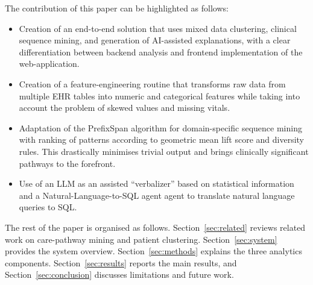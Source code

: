 The contribution of this paper can be highlighted as follows:

\begin{itemize}
  \item Creation of an end-to-end solution that uses mixed data clustering, clinical sequence mining, and generation of AI-assisted explanations, with a clear differentiation between backend analysis and frontend implementation of the web-application.
  \item Creation of a feature-engineering routine that transforms raw data from multiple EHR tables into numeric and categorical features while taking into account the problem of skewed values and missing vitals.
  \item Adaptation of the PrefixSpan algorithm for domain-specific sequence mining with ranking of patterns according to geometric mean lift score and diversity rules. This drastically minimises trivial output and brings clinically significant pathways to the forefront.
  \item Use of an LLM as an assisted ``verbalizer'' based on statistical information and a Natural-Language-to-SQL agent agent to translate natural language queries to SQL.
\end{itemize}

The rest of the paper is organised as follows. Section~\ref{sec:related} reviews related work on care-pathway mining and patient clustering. Section~\ref{sec:system} provides the system overview. Section~\ref{sec:methods} explains the three analytics components. Section~\ref{sec:results} reports the main results, and Section~\ref{sec:conclusion} discusses limitations and future work.
